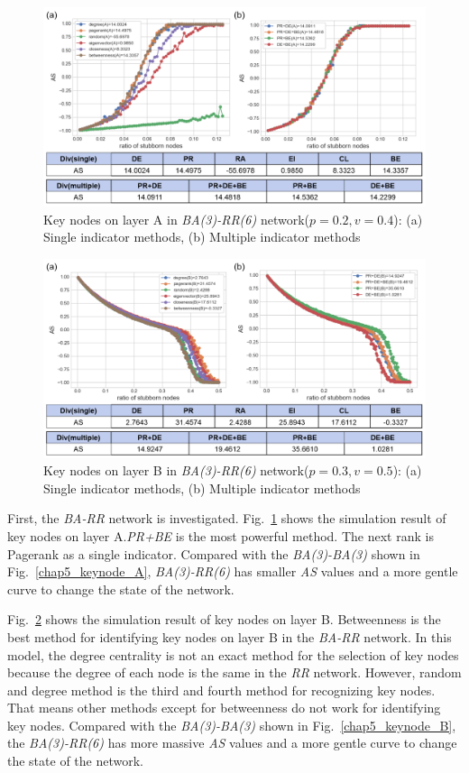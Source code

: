 \begin{figure}[!htb]
	\centering
	\includegraphics[width=\hsize]{figure/chap5_keynode_BA_RR_A.png}
	\caption{Key nodes on layer A in \textit{BA(3)-RR(6)} network($p=0.2, v=0.4$):
		(a) Single indicator methods, (b) Multiple indicator methods}
	\label{chap5_keynode_BA_RR_A}
\end{figure}
\begin{figure}[!htb]
	\centering
	\includegraphics[width=\hsize]{figure/chap5_keynode_BA_RR_B.png}
	\caption{Key nodes on layer B in \textit{BA(3)-RR(6)} network($p=0.3, v=0.5$):
		(a) Single indicator methods, (b) Multiple indicator methods}
	\label{chap5_keynode_BA_RR_B}
\end{figure}

First, the \textit{BA-RR} network is investigated. Fig.~\ref{chap5_keynode_BA_RR_A} shows the simulation result of key nodes on layer A.\textit{PR+BE} is the most powerful method. The next rank is Pagerank as a single indicator. Compared with the \textit{BA(3)-BA(3)} shown in Fig.~\ref{chap5_keynode_A}, \textit{BA(3)-RR(6)} has smaller \textit{AS} values and a more gentle curve to change the state of the network. 

Fig.~\ref{chap5_keynode_BA_RR_B} shows the simulation result of key nodes on layer B. Betweenness is the best method for identifying key nodes on layer B in the \textit{BA-RR} network. In this model, the degree centrality is not an exact method for the selection of key nodes because the degree of each node is the same in the \textit{RR} network. However, random and degree method is the third and fourth method for recognizing key nodes. That means other methods except for betweenness do not work for identifying key nodes. Compared with the \textit{BA(3)-BA(3)} shown in Fig.~\ref{chap5_keynode_B}, the \textit{BA(3)-RR(6)} has more massive \textit{AS} values and a more gentle curve to change the state of the network. 

